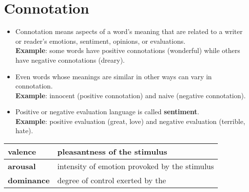 \section{Connotation \cite{nlp-1}}\label{Connotation}
\begin{itemize}
    \item Connotation means aspects of a word’s meaning that are related to a writer or reader’s emotions, sentiment, opinions, or evaluations.\\
    \textbf{Example}: some words have positive connotations (wonderful) while others have negative connotations (dreary).

    \item Even words whose meanings are similar in other ways can vary in connotation.\\
    \textbf{Example}: innocent (positive connotation) and naive (negative connotation).

    \item Positive or negative evaluation language is called \textbf{sentiment}\label{sentiment}.\\
    \textbf{Example}: positive evaluation (great, love) and negative evaluation (terrible, hate). 
\end{itemize}

\begin{table}[h!]
    \centering
    \begin{tabular}{|l|p{7cm}|}
        \hline
        \textbf{valence} & pleasantness of the stimulus \\
        \hline
        \textbf{arousal} & intensity of emotion provoked by the stimulus \\
        \hline
        \textbf{dominance} & degree of control exerted by the \\
        \hline
    \end{tabular}
\end{table}


